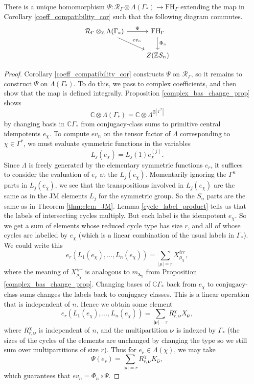 \documentclass[ALCO,Unicode]{cedram}
\newcommand{\bs}{\boldsymbol}
\newcommand{\RGamma}{\mathcal{R}_{\Gamma}}
\newcommand{\LambdaG}{\Lambda(\Gamma_*)}
\newcommand{\FHG}{\mathrm{FH}_{\Gamma}}
\newcommand{\RGamma}{\mathcal{R}_{\Gamma}}
\newcommand{\LambdaG}{\Lambda(\Gamma_*)}
\newcommand{\FHG}{\mathrm{FH}_{\Gamma}}
\begin{document}
\begin{theorem} \label{wreath_map_exists}
There is a unique homomorphism $\Psi: \RGamma \otimes \LambdaG \to \FHG$ extending the map in Corollary \ref{coeff_compatibility_cor} such that the following diagram commutes.
\begin{equation*}
\begin{tikzcd}
\RGamma \otimes_{\mathbb{Z}} \LambdaG    \arrow[r, "\Psi"]    \arrow[dr, "ev_n"]    &    \FHG    \arrow[d, "\Phi_n"]\\
&    Z(\mathbb{Z}S_n)
\end{tikzcd}
\end{equation*}
\end{theorem}
\begin{proof}
Corollary \ref{coeff_compatibility_cor} constructs $\Psi$ on $\RGamma$, so it remains to construct $\Psi$ on $\LambdaG$. To do this, we pass to complex coefficients, and then show that the map is defined integrally. Proposition \ref{complex_bas_change_prop} shows
\[
\mathbb{C} \otimes \LambdaG = \mathbb{C} \otimes \Lambda^{\otimes |\Gamma^*|}
\]
by changing basis in $\mathbb{C}\Gamma_*$ from conjugacy-class sums to primitive central idempotents $e_\chi$. To compute $ev_n$ on the tensor factor of $\Lambda$ corresponding to $\chi \in \Gamma^*$, we must evaluate symmetric functions in the variables
\[
L_j(e_\chi) = L_j(1) e_\chi^{(j)}.
\]
Since $\Lambda$ is freely generated by the elementary symmetric functions $e_r$, it suffices to consider the evaluation of $e_r$ at the $L_j(e_\chi)$. Momentarily ignoring the $\Gamma^n$ parts in $L_j(e_\chi)$, we see that the transpositions involved in $L_j(e_\chi)$ are the same as in the JM elements $L_j$ for the symmetric group. So the $S_n$ parts are the same as in Theorem \ref{thm:elem_JM}. Lemma \ref{cycle_label_product} tells us that the labels of intersecting cycles multiply. But each label is the idempotent $e_\chi$. So we get a sum of elements whose reduced cycle type has size $r$, and all of whose cycles are labelled by $e_\chi$ (which is a linear combination of the usual labels in $\Gamma_*$). We could write this
\[
e_r(L_1(e_\chi), \ldots, L_n(e_\chi)) = \sum_{|\mu| = r} X_{\mu_\chi}^{irr},
\]
where the meaning of $X_{\mu_\chi}^{irr}$ is analogous to $m_{\bs\lambda_\chi}$ from Proposition \ref{complex_bas_change_prop}. Changing bases of $\mathbb{C}\Gamma_*$ back from $e_\chi$ to conjugacy-class sums changes the labels back to conjugacy classes. This is a linear operation that is independent of $n$. Hence we obtain some element
\[
e_r(L_1(e_\chi), \ldots, L_n(e_\chi)) = \sum_{|\bs\nu| = r} R_{r, \bs\nu}^\chi X_{\bs\hat{\bs \nu}},
\]
where $R_{r, \bs\nu}^\chi$ is independent of $n$, and the multipartition $\bs\nu$ is indexed by $\Gamma_*$ (the sizes of the cycles of the elements are unchanged by changing the type so we still sum over multipartitions of size $r$). Thus for $e_r \in \Lambda(\chi)$, we may take
\[
\Psi(e_r) = \sum_{|\bs\nu| = r} R_{r, \bs\nu}^\chi K_{\bm\hat{\bs \nu}},
\]
which guarantees that $ev_n = \Phi_n \circ \Psi$.


\end{proof}
\end{document}
